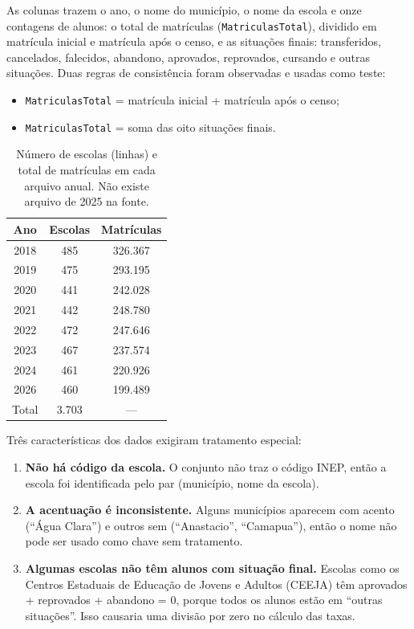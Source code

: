 \documentclass[preprint,10pt,5p]{elsarticle}
\begin{document}
As colunas trazem o ano, o nome do município, o nome da escola e onze contagens de alunos: o total de matrículas (\texttt{MatriculasTotal}), dividido em matrícula inicial e matrícula após o censo, e as situações finais: transferidos, cancelados, falecidos, abandono, aprovados, reprovados, cursando e outras situações. Duas regras de consistência foram observadas e usadas como teste:

\begin{itemize}
    \item \texttt{MatriculasTotal} = matrícula inicial + matrícula após o censo;
    \item \texttt{MatriculasTotal} = soma das oito situações finais.
\end{itemize}

\begin{table}[h!]
\centering
\caption{Número de escolas (linhas) e total de matrículas em cada arquivo anual. Não existe arquivo de 2025 na fonte.}
\label{table:dataset}
\begin{tabular}{ccc}
\toprule
Ano & Escolas & Matrículas \\
\midrule
2018 & 485 & 326.367 \\
2019 & 475 & 293.195 \\
2020 & 441 & 242.028 \\
2021 & 442 & 248.780 \\
2022 & 472 & 247.646 \\
2023 & 467 & 237.574 \\
2024 & 461 & 220.926 \\
2026 & 460 & 199.489 \\
\midrule
Total & 3.703 & --- \\
\bottomrule
\end{tabular}
\end{table}

Três características dos dados exigiram tratamento especial:

\begin{enumerate}
    \item \textbf{Não há código da escola.} O conjunto não traz o código INEP, então a escola foi identificada pelo par (município, nome da escola).
    \item \textbf{A acentuação é inconsistente.} Alguns municípios aparecem com acento (``Água Clara'') e outros sem (``Anastacio'', ``Camapua''), então o nome não pode ser usado como chave sem tratamento.
    \item \textbf{Algumas escolas não têm alunos com situação final.} Escolas como os Centros Estaduais de Educação de Jovens e Adultos (CEEJA) têm aprovados + reprovados + abandono = 0, porque todos os alunos estão em ``outras situações''. Isso causaria uma divisão por zero no cálculo das taxas.
\end{enumerate}
\end{document}

